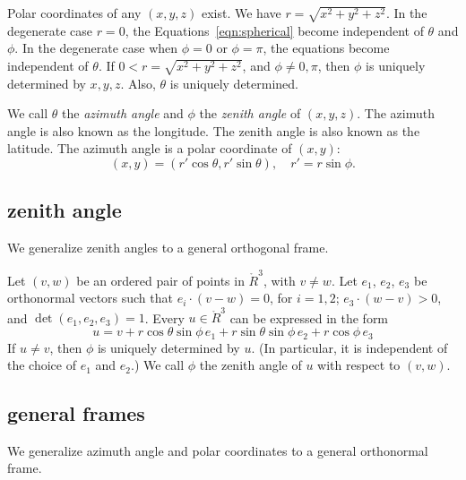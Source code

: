 Polar coordinates of any $(x,y,z)$ exist.
We have $r = \sqrt{x^2+y^2+z^2}$.  In the degenerate case $r=0$,
the Equations~\ref{eqn:spherical} become independent of $\theta$
and $\phi$. In the degenerate case when $\phi = 0$ or $\phi =
\pi$, the equations become independent of $\theta$. If $0<r =
\sqrt{x^2+y^2+z^2}$, and $\phi\ne 0,\pi$,  then $\phi$ is uniquely
determined by $x,y,z$. Also, $\theta$ is uniquely determined.


\begin{remark}\label{def:azimuth}
We call $\theta$ the {\it azimuth angle\/} and $\phi$ the {\it
zenith angle\/} of $(x,y,z)$.  The azimuth angle is also known as
the longitude.  The zenith angle is also known as the latitude. The
azimuth angle is a polar coordinate of $(x,y)$:
    $$
    (x,y) = (r'\cos\theta,r'\sin\theta), \quad r' = r\sin\phi.
    $$
\end{remark}

\subsection{zenith angle}

We generalize zenith angles to a general orthogonal frame.

\begin{definition}
Let $(v,w)$ be an ordered pair of points in $\ring{R}^3$, with $v\ne w$.
Let $e_1$, $e_2$, $e_3$ be orthonormal vectors such that
$e_i\cdot (v-w)=0$, for $i=1,2$; $e_3\cdot (w-v)>0$,
and $\det(e_1,e_2,e_3)=1$.  Every
$u\in\ring{R}^3$ 
can be expressed in the form
   $$
   u = v + r\cos\theta\sin\phi\,e_1 + r\sin\theta\sin\phi\,e_2 +
   r\cos\phi\, e_3
   $$
If $u\ne v$, then $\phi$ is uniquely determined by $u$.
(In particular, it is independent of the choice of $e_1$ and $e_2$.)
We call $\phi$ the zenith angle of $u$ with respect to $(v,w)$.
\end{definition}

\subsection{general frames}

We generalize azimuth angle and polar coordinates to a general orthonormal frame.

